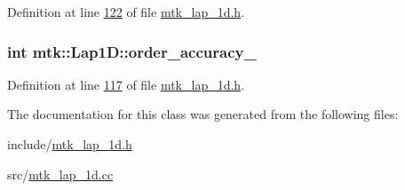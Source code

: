 Definition at line \hyperlink{mtk__lap__1d_8h_source_l00122}{122} of file \hyperlink{mtk__lap__1d_8h_source}{mtk\-\_\-lap\-\_\-1d.\-h}.

\hypertarget{classmtk_1_1Lap1D_a35d34c085b9cf6f9961a699dfb02fea6}{
\subsubsection[{order\-\_\-accuracy\-\_\-}]{\setlength{\rightskip}{0pt plus 5cm}int mtk\-::\-Lap1\-D\-::order\-\_\-accuracy\-\_\-\hspace{0.3cm}{\ttfamily [private]}}}\label{classmtk_1_1Lap1D_a35d34c085b9cf6f9961a699dfb02fea6}


Definition at line \hyperlink{mtk__lap__1d_8h_source_l00117}{117} of file \hyperlink{mtk__lap__1d_8h_source}{mtk\-\_\-lap\-\_\-1d.\-h}.



The documentation for this class was generated from the following files\-:\begin{DoxyCompactItemize}
\item 
include/\hyperlink{mtk__lap__1d_8h}{mtk\-\_\-lap\-\_\-1d.\-h}\item 
src/\hyperlink{mtk__lap__1d_8cc}{mtk\-\_\-lap\-\_\-1d.\-cc}\end{DoxyCompactItemize}
